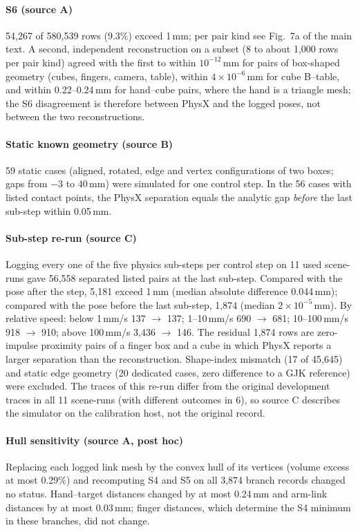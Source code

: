 \paragraph{S6 (source A)} 54,267 of 580,539 rows (9.3\%) exceed 1\,mm; per pair kind see Fig.~7a of the main text. A second, independent reconstruction on a subset (8 to about 1,000 rows per pair kind) agreed with the first to within $10^{-12}$\,mm for pairs of box-shaped geometry (cubes, fingers, camera, table), within $4\times10^{-6}$\,mm for cube B--table, and within 0.22--0.24\,mm for hand--cube pairs, where the hand is a triangle mesh; the S6 disagreement is therefore between PhysX and the logged poses, not between the two reconstructions.

\paragraph{Static known geometry (source B)} 59 static cases (aligned, rotated, edge and vertex configurations of two boxes; gaps from $-3$ to $40$\,mm) were simulated for one control step. In the 56 cases with listed contact points, the PhysX separation equals the analytic gap \emph{before} the last sub-step within 0.05\,mm.

\paragraph{Sub-step re-run (source C)} Logging every one of the five physics sub-steps per control step on 11 used scene-runs gave 56,558 separated listed pairs at the last sub-step. Compared with the pose after the step, 5,181 exceed 1\,mm (median absolute difference 0.044\,mm); compared with the pose before the last sub-step, 1,874 (median $2\times10^{-5}$\,mm). By relative speed: below 1\,mm/s 137 $\to$ 137; 1--10\,mm/s 690 $\to$ 681; 10--100\,mm/s 918 $\to$ 910; above 100\,mm/s 3,436 $\to$ 146. The residual 1,874 rows are zero-impulse proximity pairs of a finger box and a cube in which PhysX reports a larger separation than the reconstruction. Shape-index mismatch (17 of 45,645) and static edge geometry (20 dedicated cases, zero difference to a GJK reference) were excluded. The traces of this re-run differ from the original development traces in all 11 scene-runs (with different outcomes in 6), so source C describes the simulator on the calibration host, not the original record.

\paragraph{Hull sensitivity (source A, post hoc)} Replacing each logged link mesh by the convex hull of its vertices (volume excess at most 0.29\%) and recomputing S4 and S5 on all 3,874 branch records changed no status. Hand--target distances changed by at most 0.24\,mm and arm-link distances by at most 0.03\,mm; finger distances, which determine the S4 minimum in these branches, did not change.
